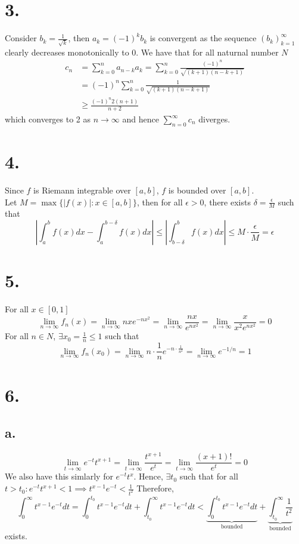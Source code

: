\documentclass[11pt]{article}
\begin{document}
\section*{3.}
Consider $b_k = \frac{1}{\sqrt{k}}$, then $a_k = (-1)^k b_k$ is convergent as the sequence $(b_k)_{k=1}^\infty$ clearly decreases monotonically to 0.
We have that for all naturnal number $N$
\begin{equation*}
    \begin{aligned}
        c_n &= \sum_{k=0}^n a_{n-k}a_k = \sum_{k=0}^n \frac{(-1)^n}{\sqrt{(k+1)(n-k+1)}} \\
        & = (-1)^n \sum_{k=0}^n \frac{1}{\sqrt{(k+1)(n-k+1)}} \\
        & \ge \frac{(-1)^n2(n+1)}{n+2}
    \end{aligned}
\end{equation*}
which converges to 2 as $n \to \infty$ and hence $\sum_{n=0}^\infty c_n$ diverges.
\pagebreak
\section*{4.}
Since $f$ is Riemann integrable over $[a,b]$, $f$ is bounded over $[a,b]$. \\
Let $M = \max\{|f(x)|: x \in [a,b]\}$, then for all $\epsilon >0$, 
there exists $\delta = \frac{\epsilon}{M}$ such that 
\[
    \left|\int_a^{b} f(x) dx - \int_a^{b - \delta} f(x) dx \right| \le \left|\int_{b-\delta}^b f(x) dx \right| \le M \cdot \frac{\epsilon}{M} = \epsilon 
\]
\pagebreak
\section*{5.}
For all $x \in [0,1]$
\[
    \lim_{n \to \infty} f_n(x) = \lim_{n \to \infty} nxe^{-nx^2} = \lim_{n \to \infty} \frac{nx}{e^{nx^2}} = \lim_{n \to \infty} \frac{x}{x^2 e^{nx^2}} = 0
\]
For all $n \in N$, $\exists x_0 = \frac{1}{n} \le 1$ such that 
\[
    \lim_{n \to \infty} f_n(x_0) = \lim_{n \to \infty} n \cdot \frac{1}{n} e^{-n \cdot \frac{1}{n^2}} = \lim_{n \to \infty} e^{-1/n} = 1
\]
\pagebreak
\section*{6.}
\subsection*{a.}
\[
    \lim_{t \to \infty} e^{-t} t^{x+1} = \lim_{t \to \infty} \frac{t^{x+1}}{e^t} = \lim_{t \to \infty} \frac{(x+1)!}{e^t} = 0   
\]
We also have this simlarly for $e^{-t}t^x$. Hence, $\exists t_0$ such that for all $t > t_0: e^{-t}t^{x+1} < 1 \implies t^{x-1} e^{-t} < \frac{1}{t^2}$
Therefore, 
\[
    \int_0^\infty t^{x-1}e^{-t}dt = \int_0^{t_0} t^{x-1}e^{-t}dt + \int_{t_0}^\infty t^{x-1}e^{-t} dt < \underbrace{\int_0^{t_0}  t^{x-1}e^{-t}dt}_{\text{bounded}} + \underbrace{\int_{t_0}^\infty \frac{1}{t^2}}_{\text{bounded}}
\]
exists.
\end{document}
